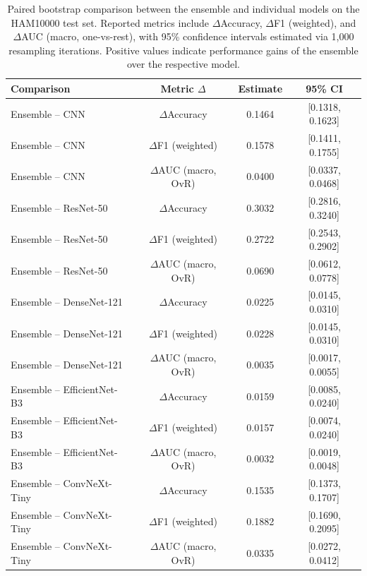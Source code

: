 \documentclass[pdflatex,sn-mathphys-num]{sn-jnl}%
\theoremstyle{thmstyleone}%
\theoremstyle{thmstyletwo}%
\theoremstyle{thmstylethree}%
\begin{document}
\begin{table}[!htbp]
\centering
\caption{Paired bootstrap comparison between the ensemble and individual models on the HAM10000 test set. 
Reported metrics include $\Delta$Accuracy, $\Delta$F1 (weighted), and $\Delta$AUC (macro, one-vs-rest), with 95\% confidence intervals estimated via 1,000 resampling iterations. 
Positive values indicate performance gains of the ensemble over the respective model.}
\label{tab:paired-bootstrap}
\footnotesize
\setlength{\tabcolsep}{4pt}
\renewcommand{\arraystretch}{1.1}
\begin{tabular*}{\textwidth}{@{\extracolsep\fill}lccc}
\toprule
\textbf{Comparison} & \textbf{Metric $\Delta$} & \textbf{Estimate} & \textbf{95\% CI} \\
\midrule
Ensemble – CNN             & $\Delta$Accuracy         & 0.1464 & [0.1318, 0.1623] \\
Ensemble – CNN             & $\Delta$F1 (weighted)    & 0.1578 & [0.1411, 0.1755] \\
Ensemble – CNN             & $\Delta$AUC (macro, OvR) & 0.0400 & [0.0337, 0.0468] \\
Ensemble – ResNet-50       & $\Delta$Accuracy         & 0.3032 & [0.2816, 0.3240] \\
Ensemble – ResNet-50       & $\Delta$F1 (weighted)    & 0.2722 & [0.2543, 0.2902] \\
Ensemble – ResNet-50       & $\Delta$AUC (macro, OvR) & 0.0690 & [0.0612, 0.0778] \\
Ensemble – DenseNet-121    & $\Delta$Accuracy         & 0.0225 & [0.0145, 0.0310] \\
Ensemble – DenseNet-121    & $\Delta$F1 (weighted)    & 0.0228 & [0.0145, 0.0310] \\
Ensemble – DenseNet-121    & $\Delta$AUC (macro, OvR) & 0.0035 & [0.0017, 0.0055] \\
Ensemble – EfficientNet-B3 & $\Delta$Accuracy         & 0.0159 & [0.0085, 0.0240] \\
Ensemble – EfficientNet-B3 & $\Delta$F1 (weighted)    & 0.0157 & [0.0074, 0.0240] \\
Ensemble – EfficientNet-B3 & $\Delta$AUC (macro, OvR) & 0.0032 & [0.0019, 0.0048] \\
Ensemble – ConvNeXt-Tiny   & $\Delta$Accuracy         & 0.1535 & [0.1373, 0.1707] \\
Ensemble – ConvNeXt-Tiny   & $\Delta$F1 (weighted)    & 0.1882 & [0.1690, 0.2095] \\
Ensemble – ConvNeXt-Tiny   & $\Delta$AUC (macro, OvR) & 0.0335 & [0.0272, 0.0412] \\

\end{tabular*}
\end{table}
\end{document}
